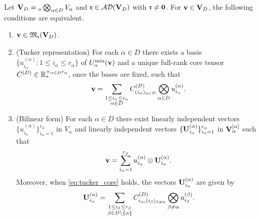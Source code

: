 \begin{lemma}
\label{lem:tucker_characterisation}
Let $\mathbf{V}_D = {}_a\bigotimes_{\alpha \in D} V_\alpha$ and $\mathfrak{r} \in \mathcal{AD}(\mathbf{V}_D)$
with $\mathfrak{r} \neq \mathbf{0}$. For $\mathbf{v} \in \mathbf{V}_D$, the following conditions
are equivalent.
\begin{enumerate}
\item[\textup{(a)}] $\mathbf{v} \in \mathfrak{M}_{\mathfrak{r}}(\mathbf{V}_D)$.
\item[\textup{(b)}] \textup{(Tucker representation)} For each $\alpha \in D$ there exists a
    basis $\{u^{(\alpha)}_{i_\alpha} : 1 \leq i_\alpha \leq r_\alpha\}$
    of $U^{\min}_{\alpha}(\mathbf{v})$ and a unique full-rank core tensor
    $C^{(D)} \in \mathbb{R}^{\times_{\alpha \in D} r_\alpha}_*$,
    once the bases are fixed, such that
    \begin{equation}
    \label{eq:tucker_core}
        \mathbf{v} = \sum_{\substack{1 \leq i_\alpha \leq r_\alpha \\ \alpha \in D}}
        C^{(D)}_{(i_\alpha)_{\alpha \in D}}
        \bigotimes_{\alpha \in D} u^{(\alpha)}_{i_\alpha}.
    \end{equation}
\item[\textup{(c)}] \textup{(Bilinear form)} For each $\alpha \in D$ there exist
    linearly independent vectors
    $\{u^{(\alpha)}_{i_\alpha}\}_{i_\alpha=1}^{r_\alpha}$ in $V_\alpha$
    and linearly independent vectors
    $\{\mathbf{U}^{(\alpha)}_{i_\alpha}\}_{i_\alpha=1}^{r_\alpha}$
    in $\mathbf{V}_\alpha^{[\alpha]}$ such that
    \begin{equation}
    \label{eq:tucker_bilinear}
        \mathbf{v} = \sum_{i_\alpha=1}^{r_\alpha}
        u^{(\alpha)}_{i_\alpha} \otimes \mathbf{U}^{(\alpha)}_{i_\alpha}.
    \end{equation}
    Moreover, when \eqref{eq:tucker_core} holds, the vectors
    $\mathbf{U}^{(\alpha)}_{i_\alpha}$ are given by
    \begin{equation}
    \label{eq:tucker_Ualpha}
        \mathbf{U}^{(\alpha)}_{i_\alpha} =
        \sum_{\substack{1 \leq i_\beta \leq r_\beta \\ \beta \in D \setminus \{\alpha\}}}
        C^{(D)}_{i_\alpha, (i_\beta)_{\beta \neq \alpha}}
        \bigotimes_{\beta \neq \alpha} u^{(\beta)}_{i_\beta}.
    \end{equation}
\end{enumerate}
\end{lemma}

